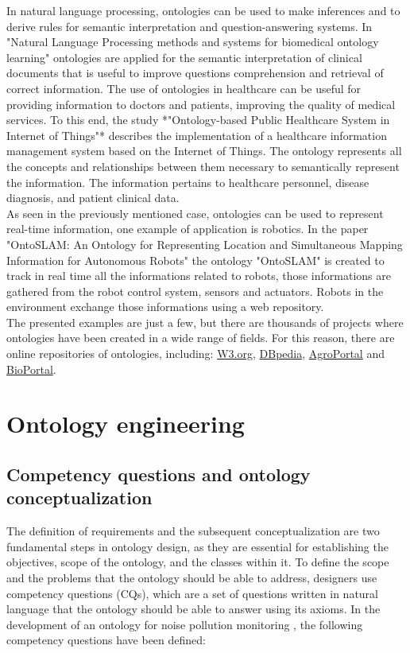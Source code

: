 In natural language processing, ontologies can be used to make inferences and to derive rules for semantic interpretation and question-answering systems. In "Natural Language Processing methods and systems for biomedical ontology learning" \cite{liu2011natural} ontologies are applied for the semantic interpretation of clinical documents that is useful to improve questions comprehension and retrieval of correct information.
The use of ontologies in healthcare can be useful for providing information to doctors and patients, improving the quality of medical services. To this end, the study *"Ontology-based Public Healthcare System in Internet of Things"* \cite{kumar2015ontology} describes the implementation of a healthcare information management system based on the Internet of Things. The ontology represents all the concepts and relationships between them necessary to semantically represent the information. The information pertains to healthcare personnel, disease diagnosis, and patient clinical data.\\
As seen in the previously mentioned case, ontologies can be used to represent real-time information, one example of application is robotics. In the paper "OntoSLAM: An Ontology for Representing Location and Simultaneous Mapping Information for Autonomous Robots" \cite{cornejo2021ontoslam} the ontology "OntoSLAM" is created to track in real time all the informations related to robots, those informations are gathered from the robot control system, sensors and actuators. Robots in the environment exchange those informations using a web repository.\\
The presented examples are just a few, but there are thousands of projects where ontologies have been created in a wide range of fields. For this reason, there are online repositories of ontologies, including: \href{https://www.w3.org/wiki/Lists_of_ontologies}{W3.org}, \href{https://archivo.dbpedia.org/list}{DBpedia}, \href{https://agroportal.lirmm.fr/ontologies?search=o}{AgroPortal} and \href{https://bioportal.bioontology.org/ontologies}{BioPortal}. 

\section{Ontology engineering}

\subsection{Competency questions and ontology conceptualization}
The definition of requirements and the subsequent conceptualization are two fundamental steps in ontology design, as they are essential for establishing the objectives, scope of the ontology, and the classes within it. To define the scope and the problems that the ontology should be able to address, designers use competency questions (CQs), which are a set of questions written in natural language that the ontology should be able to answer using its axioms. \cite{malheiros2013method}
In the development of an ontology for noise pollution monitoring \cite{espinoza2020using}, the following competency questions have been defined:

